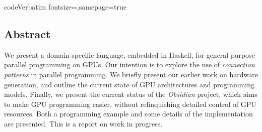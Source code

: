 





   \DefineVerbatimEnvironment
     {code}{Verbatim}
     {fontsize=\small,samepage=true}
%


       



\subsection*{Abstract}

We present a domain specific language, embedded in Haskell, for general
purpose parallel programming on GPUs. Our intention is to explore the use of
{\em connection patterns} in parallel programming. We briefly present our
earlier work on hardware generation, and outline the current state of GPU
architectures and programming models. Finally, we present the current status
of the {\em Obsidian} project, which aims to make GPU programming easier,
without relinquishing detailed control of GPU resources. Both a programming
example and some details of the implementation are presented. This is a
report on work in progress.











%
